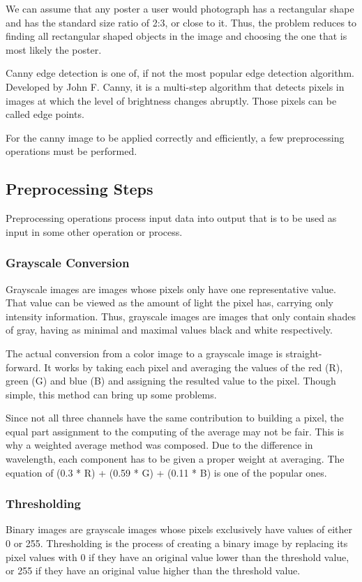 \documentclass[12pt,a4paper,twoside]{report}
\begin{document}
We can assume that any poster a user would photograph has a rectangular shape and has the standard size ratio of 2:3, or close to it. Thus, the problem reduces to finding all rectangular shaped objects in the image and choosing the one that is most likely the poster.

Canny edge detection is one of, if not the most popular edge detection algorithm. Developed by John F. Canny, it is a multi-step algorithm that detects pixels in images at which the level of brightness changes abruptly. Those pixels can be called edge points.

For the canny image to be applied correctly and efficiently, a few preprocessing operations must be performed.

\subsection{Preprocessing Steps}
Preprocessing operations process input data into output that is to be used as input in some other operation or process.

\subsubsection{Grayscale Conversion}
Grayscale images are images whose pixels only have one representative value. That value can be viewed as the amount of light the pixel has, carrying only intensity information. Thus, grayscale images are images that only contain shades of gray, having as minimal and maximal values black and white respectively.

The actual conversion from a color image to a grayscale image is straight-forward. It works by taking each pixel and averaging the values of the red (R), green (G) and blue (B) and assigning the resulted value to the pixel. Though simple, this method can bring up some problems. 

Since not all three channels have the same contribution to building a pixel, the equal part assignment to the computing of the average may not be fair. This is why a weighted average method was composed. Due to the difference in wavelength, each component has to be given a proper weight at averaging. The equation of (0.3 * R) + (0.59 * G) + (0.11 * B) is one of the popular ones.

\subsubsection{Thresholding}
Binary images are grayscale images whose pixels exclusively have values of either 0 or 255. Thresholding is the process of creating a binary image by replacing its pixel values with 0 if they have an original value lower than the threshold value, or 255 if they have an original value higher than the threshold value.
\end{document}
